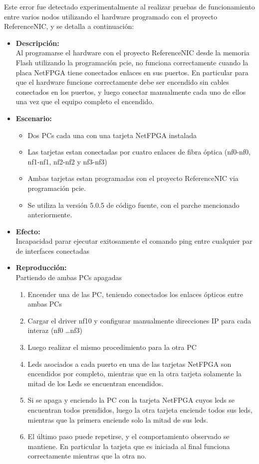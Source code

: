 Este error fue detectado experimentalmente al realizar pruebas de funcionamiento entre varios nodos utilizando el hardware programado con el proyecto ReferenceNIC, y se detalla a continuaci\'on:

\begin{itemize}
\item \textbf{Descripci\'on:}\\
Al programarse el hardware con el proyecto ReferenceNIC desde la memoria Flash utilizando la programaci\'on pcie, no funciona correctamente cuando la placa NetFPGA tiene conectados enlaces en sus puertos. En particular para que el hardware funcione correctamente debe ser encendido sin cables conectados en los puertos, y luego conectar manualmente cada uno de ellos una vez que el equipo completo el encendido.

\item \textbf{Escenario:}
\begin{itemize}
\item Dos PCs cada una con una tarjeta NetFPGA instalada
\item Las tarjetas estan conectadas por cuatro enlaces de fibra \'optica (nf0-nf0, nf1-nf1, nf2-nf2 y nf3-nf3)
\item Ambas tarjetas estan programadas con el proyecto ReferenceNIC via programaci\'on pcie.
\item Se utiliza la versi\'on 5.0.5 de c\'odigo fuente, con el parche mencionado anteriormente.
\end{itemize}

\item \textbf{Efecto:}\\
Incapacidad parar ejecutar exitosamente el comando ping entre cualquier par de interfaces conectadas

\item \textbf{Reproducci\'on:}\\
Partiendo de ambas PCs apagadas
\begin{enumerate}
\item Encender una de las PC, teniendo conectados los enlaces \'opticos entre ambas PCs
\item Cargar el driver nf10 y configurar manualmente direcciones IP para cada interaz (nf0 \dots nf3)
\item Luego realizar el mismo procedimiento para la otra PC
\item Leds asociados a cada puerto en una de las tarjetas NetFPGA son encendidos por completo, mientras que en la otra tarjeta solamente la mitad de los Leds se encuentran encendidos.
\item Si se apaga y enciendo la PC con la tarjeta NetFPGA cuyos leds se encuentran todos prendidos, luego la otra tarjeta enciende todos sus leds, mientras que la primera enciende solo la mitad de sus leds. 
\item El \'ultimo paso puede repetirse, y el comportamiento observado se mantiene. En particular la tarjeta que es iniciada al final funciona correctamente mientras que la otra no.
\end{enumerate} 


\end{itemize}
